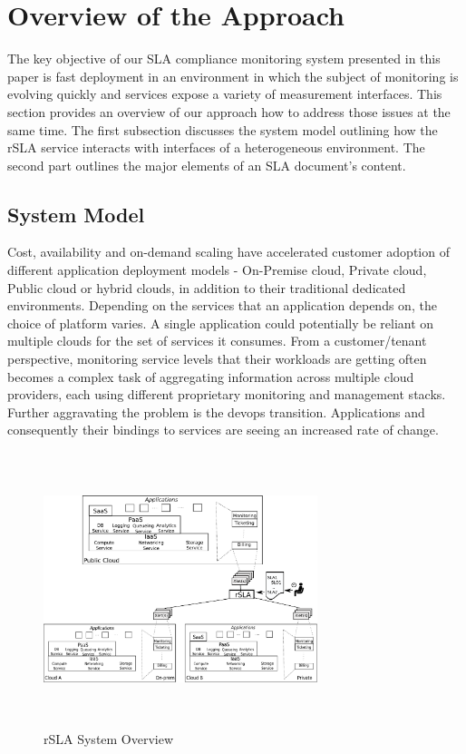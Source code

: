\section{Overview of the Approach}

The key objective of our SLA compliance monitoring system presented in this paper is fast deployment in an environment in which the subject of monitoring is evolving quickly and services expose a variety of measurement interfaces. This section provides an overview of our approach how to address those issues at the same time. The first subsection discusses the system model outlining how the rSLA service interacts with interfaces of a heterogeneous environment. The second part outlines the major elements of an SLA document's content.

\subsection{System Model}

Cost, availability and on-demand scaling have accelerated customer adoption of different application deployment models - On-Premise cloud, Private cloud, Public cloud or hybrid 
clouds, in addition to their traditional dedicated environments. Depending on the services that an application depends on, the choice of platform varies. A single application could potentially be reliant on multiple clouds for the set of 
services it consumes. From a customer/tenant perspective, monitoring service levels that their workloads are getting often becomes a complex task of aggregating information across 
multiple cloud providers, each using different proprietary monitoring and management stacks. Further aggravating the problem is the devops transition. Applications and consequently 
their bindings to services are seeing an increased rate of change. 

\begin{figure}[H]
\centering
 \includegraphics[width=8cm,height=8cm]{pics/systemModel.pdf} 
 \caption{rSLA System Overview}
 \label{fig:systemModel}
\end{figure}

